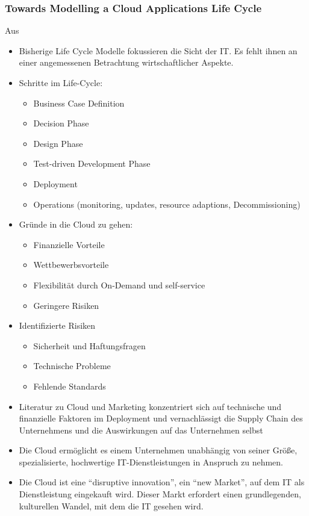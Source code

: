 \subsubsection{Towards Modelling a Cloud Applications Life Cycle}
Aus 
\begin{itemize}
	\item Bisherige Life Cycle Modelle fokussieren die Sicht der IT. Es fehlt
	ihnen an einer angemessenen Betrachtung wirtschaftlicher Aspekte.
	\item Schritte im Life-Cycle:
	\begin{itemize}
		\item Business Case Definition
		\item Decision Phase
		\item Design Phase
		\item Test-driven Development Phase
		\item Deployment
		\item Operations (monitoring, updates, resource adaptions, Decommissioning)
	\end{itemize}
	\item Gründe in die Cloud zu gehen:
	\begin{itemize}
		\item Finanzielle Vorteile
		\item Wettbewerbsvorteile
		\item Flexibilität durch On-Demand und self-service
		\item Geringere Risiken
	\end{itemize}
	\item Identifizierte Risiken
	\begin{itemize}
		\item Sicherheit und Haftungsfragen
		\item Technische Probleme
		\item Fehlende Standards
	\end{itemize}
	\item Literatur zu Cloud und Marketing konzentriert sich auf technische
	und finanzielle Faktoren im Deployment und vernachlässigt die Supply Chain
	des Unternehmens und die Auswirkungen auf das Unternehmen selbst
	\item Die Cloud ermöglicht es einem Unternehmen unabhängig von seiner Größe,
	spezialisierte, hochwertige IT-Dienstleistungen in Anspruch zu nehmen.
	\item Die Cloud ist eine ``disruptive innovation'', ein ``new Market'', auf dem IT als Dienstleistung eingekauft wird. Dieser Markt erfordert einen grundlegenden, kulturellen Wandel, mit dem die IT gesehen wird.

\end{itemize}
